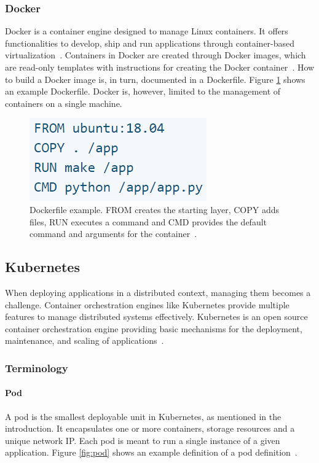 \subsubsection{Docker}
Docker is a container engine designed to manage Linux containers. It offers functionalities to develop, ship and run applications through container-based virtualization~\citep{Docker}. Containers in Docker are created through Docker images, which are read-only templates with instructions for creating the Docker container~\citep{Docker-image}. How to build a Docker image is, in turn, documented in a Dockerfile. Figure \ref{fig:dockerfile} shows an example Dockerfile. Docker is, however, limited to the management of containers on a single machine.

\begin{figure}
\begin{center}
\includegraphics[width=0.35 \columnwidth]{Images/Dockerfile.PNG}
\end{center}
\captionsetup{justification=centering}
\caption{Dockerfile example. FROM creates the starting layer, COPY adds files, RUN executes a command and CMD provides the default command and arguments for the container~\citep{Dockerfile}.}
\label{fig:dockerfile}
\end{figure}

\subsection{Kubernetes}
When deploying applications in a distributed context, managing them becomes a challenge. Container orchestration engines like Kubernetes provide multiple features to manage distributed systems effectively. Kubernetes is an open source container orchestration engine providing basic mechanisms for the deployment, maintenance, and scaling of applications~\citep{kubernetes_github}.

\subsubsection{Terminology}

\paragraph{Pod} A pod is the smallest deployable unit in Kubernetes, as mentioned in the introduction. It encapsulates one or more containers, storage resources and a unique network IP. Each pod is meant to run a single instance of a given application. Figure \ref{fig:pod} shows an example definition of a pod definition~\citep{Kubernetes-Pod}.

